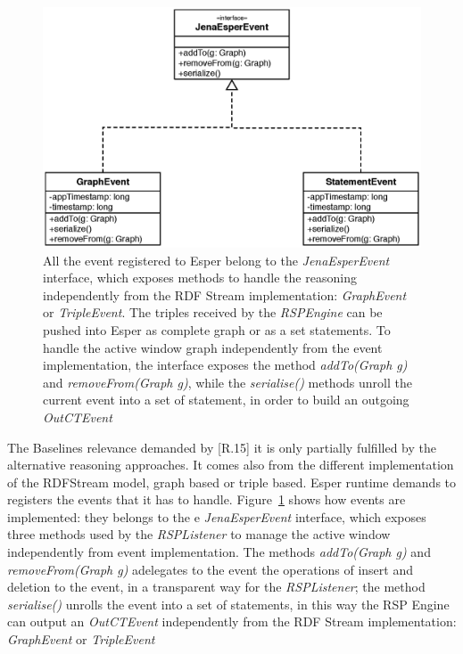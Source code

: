 \begin{figure}[p!]
  \centering
	\includegraphics[width=0.8\linewidth]{images/uml_baselines_events}
	\caption[Esper-level Graph based and Triple based - UML Schema]{ All the event registered to Esper belong to the \textit{JenaEsperEvent} interface, which exposes methods to handle the reasoning independently from the RDF Stream implementation:  \textit{GraphEvent} or \textit{TripleEvent}. The triples received by the \textit{RSPEngine} can be pushed into Esper as complete graph or as a set statements. To handle the active window graph independently from the event implementation, the interface exposes the method \textit{addTo(Graph g)} and \textit{removeFrom(Graph g)}, while the \textit{serialise()} methods unroll the current event into a set of statement, in order to build an outgoing \textit{OutCTEvent}}
  	\label{fig:uml_baselines_events}
\end{figure}

The Baselines relevance demanded by [R.15] it is only partially fulfilled by the alternative reasoning approaches. It comes also from the different implementation of the RDFStream model, graph based or triple based. Esper runtime demands to registers the events that it has to handle. Figure~\ref{fig:uml_baselines_events} shows how events are implemented: they belongs to the e \textit{JenaEsperEvent} interface, which exposes three methods used by the \textit{RSPListener} to manage the active window independently from event implementation. The methods \textit{addTo(Graph g)} and \textit{removeFrom(Graph g)} adelegates to the event the operations of insert and deletion to the event, in a transparent way for the \textit{RSPListener}; the method \textit{serialise()} unrolls the event into a set of statements, in this way the RSP Engine can output an \textit{OutCTEvent} independently from the RDF Stream implementation: \textit{GraphEvent} or \textit{TripleEvent}

